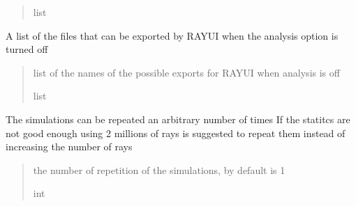 \documentclass[letterpaper,10pt,english]{sphinxmanual}
\begin{document}
\begin{fulllineitems}
\begin{fulllineitems}
\begin{quote}
\begin{description}
\sphinxAtStartPar
list

\end{description}\end{quote}

\end{fulllineitems}


\begin{fulllineitems}
\label{\detokenize{index:raypyng.simulate.Simulate.possible_exports_without_analysis}}
\pysigstartsignatures
{}
\pysigstopsignatures
\sphinxAtStartPar
A list of the files that can be exported by RAY\sphinxhyphen{}UI when the
analysis option is turned off
\begin{quote}\begin{description}
\sphinxAtStartPar
list of the names of the possible exports for RAY\sphinxhyphen{}UI when analysis is off

\sphinxAtStartPar
list

\end{description}\end{quote}

\end{fulllineitems}


\begin{fulllineitems}
\label{\detokenize{index:raypyng.simulate.Simulate.repeat}}
\pysigstartsignatures
{}
\pysigstopsignatures
\sphinxAtStartPar
The simulations can be repeated an arbitrary number of times
If the statitcs are not good enough using 2 millions of rays is suggested
to repeat them instead of increasing the number of rays
\begin{quote}\begin{description}
\sphinxAtStartPar
the number of repetition of the simulations, by default is 1

\sphinxAtStartPar
int


\end{description}
\end{quote}
\end{fulllineitems}
\end{fulllineitems}
\end{document}
